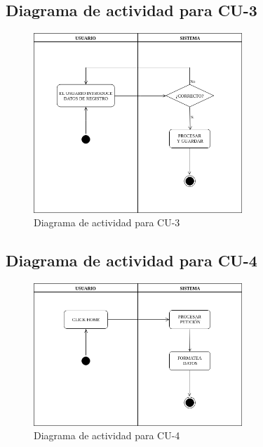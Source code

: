 \subsection{Diagrama de actividad para CU-3 }
\begin{figure}[H]
  \begin{center}
    \includegraphics[width=0.7\textwidth]{imagenes/DA-CU-3.png}
    \caption{Diagrama de actividad para CU-3}
    \label{fig:DA-CU-3}
  \end{center}
\end{figure}
\subsection{Diagrama de actividad para CU-4 }
\begin{figure}[H]
  \begin{center}
    \includegraphics[width=0.7\textwidth]{imagenes/DA-CU-4.png}
    \caption{Diagrama de actividad para CU-4}
    \label{fig:DA-CU-4}
  \end{center}
\end{figure}
